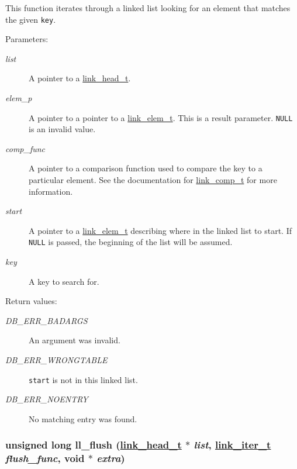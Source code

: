 This function iterates through a linked list looking for an element that matches the given {\tt key}.\begin{Desc}
\item[Parameters: ]\par
\begin{description}
\item[{\em 
list}]A pointer to a \hyperlink{group__dbprim__link_a0}{link\_\-head\_\-t}. \item[{\em 
elem\_\-p}]A pointer to a pointer to a \hyperlink{group__dbprim__link_a1}{link\_\-elem\_\-t}. This is a result parameter. {\tt NULL} is an invalid value. \item[{\em 
comp\_\-func}]A pointer to a comparison function used to compare the key to a particular element. See the documentation for \hyperlink{group__dbprim__link_a3}{link\_\-comp\_\-t} for more information. \item[{\em 
start}]A pointer to a \hyperlink{group__dbprim__link_a1}{link\_\-elem\_\-t} describing where in the linked list to start. If {\tt NULL} is passed, the beginning of the list will be assumed. \item[{\em 
key}]A key to search for.\end{description}
\end{Desc}
\begin{Desc}
\item[Return values: ]\par
\begin{description}
\item[{\em 
DB\_\-ERR\_\-BADARGS}]An argument was invalid. \item[{\em 
DB\_\-ERR\_\-WRONGTABLE}]{\tt start} is not in this linked list. \item[{\em 
DB\_\-ERR\_\-NOENTRY}]No matching entry was found. \end{description}
\end{Desc}
\hypertarget{group__dbprim__link_a11}{
\subsubsection[ll\_\-flush]{\setlength{\rightskip}{0pt plus 5cm}unsigned long ll\_\-flush (\hyperlink{group__dbprim__link_a0}{link\_\-head\_\-t} $\ast$ {\em list}, \hyperlink{group__dbprim__link_a2}{link\_\-iter\_\-t} {\em flush\_\-func}, void $\ast$ {\em extra})}}
\label{group__dbprim__link_a11}


